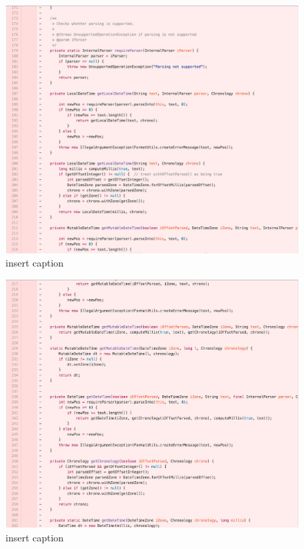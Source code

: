 \begin{figure}[H]
	\centering
	\includegraphics[width=\linewidth]{code70}
	\caption{insert caption}
\end{figure}
\begin{figure}[H]
	\centering
	\includegraphics[width=\linewidth]{code71}
	\caption{insert caption}
\end{figure}
